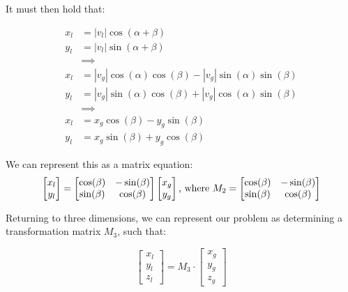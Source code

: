 \documentclass[12pt]{article}
\begin{document}
It must then hold that:

\begin{equation}
    \begin{aligned}
        x_l &= |v_l| \cos(\alpha + \beta) \\
        y_l &= |v_l| \sin(\alpha + \beta) \\
            &\implies \\
        x_l &= |v_g| \cos(\alpha)\cos(\beta) - |v_g| \sin(\alpha)\sin(\beta) \\
        y_l &= |v_g| \sin(\alpha)\cos(\beta) + |v_g| \cos(\alpha)\sin(\beta)
        \\
            &\implies \\
        x_l &= x_g \cos(\beta) - y_g \sin(\beta) \\
        y_l &= x_g \sin(\beta) + y_g \cos(\beta)
    \end{aligned}
\end{equation}

We can represent this as a matrix equation:
\begin{equation}
    \begin{bmatrix}
    x_l \\
    y_l
    \end{bmatrix}
    = 
    \begin{bmatrix}
    \cos(\beta) & -\sin(\beta) \\
    \sin(\beta) & \cos(\beta)
    \end{bmatrix}
    \begin{bmatrix}
    x_g \\
    y_g
    \end{bmatrix}
    \\ \text{, where } \\
    M_2 = 
    \begin{bmatrix}
    \cos(\beta) & -\sin(\beta) \\
    \sin(\beta) & \cos(\beta)
    \end{bmatrix}
\end{equation}

Returning to three dimensions, we can represent our problem as determining a transformation matrix $M_3$, such that:

\begin{equation}
   \begin{bmatrix}
    x_l \\
    y_l \\
    z_l
    \end{bmatrix}
    = M_3 \cdot
    \begin{bmatrix}
    x_g \\
    y_g \\
    z_g
    \end{bmatrix}
\label{eq:basis-transformation}
\end{equation}
\end{document}
